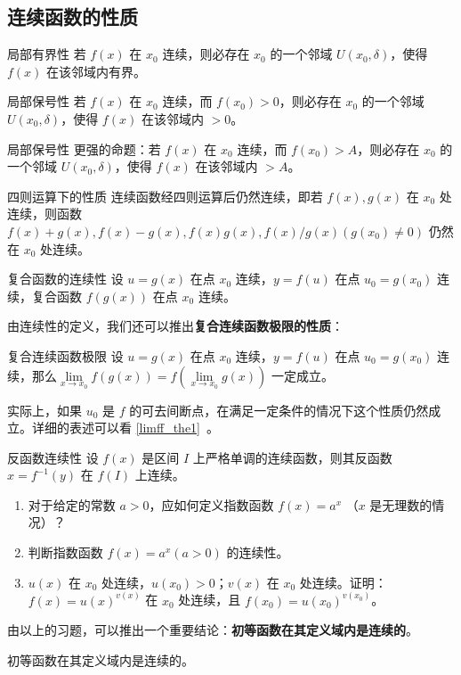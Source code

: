 \subsection{连续函数的性质}
\begin{theorem}{局部有界性}
若 $f(x)$ 在 $x_0$ 连续，则必存在 $x_0$ 的一个邻域 $U(x_0,\delta)$，使得 $f(x)$ 在该邻域内有界。
\end{theorem}
\begin{theorem}{局部保号性}
若 $f(x)$ 在 $x_0$ 连续，而 $f(x_0)>0$，则必存在 $x_0$ 的一个邻域 $U(x_0,\delta)$，使得 $f(x)$ 在该邻域内 $>0$。
\end{theorem}
\begin{theorem}{局部保号性}
更强的命题：若 $f(x)$ 在 $x_0$ 连续，而 $f(x_0)>A$，则必存在 $x_0$ 的一个邻域 $U(x_0,\delta)$，使得 $f(x)$ 在该邻域内 $>A$。
\end{theorem}
\begin{theorem}{四则运算下的性质}
连续函数经四则运算后仍然连续，即若 $f(x),g(x)$ 在 $x_0$ 处连续，则函数 $f(x)+g(x),f(x)-g(x),f(x)g(x),f(x)/g(x)(g(x_0)\neq 0)$ 仍然在 $x_0$ 处连续。
\end{theorem}

\begin{theorem}{复合函数的连续性}
设 $u=g(x)$ 在点 $x_0$ 连续，$y=f(u)$ 在点 $u_0=g(x_0)$ 连续，复合函数 $f(g(x))$ 在点 $x_0$ 连续。
\end{theorem}

由连续性的定义，我们还可以推出\textbf{复合连续函数极限的性质}：
\begin{theorem}{复合连续函数极限}
设 $u=g(x)$ 在点 $x_0$ 连续，$y=f(u)$ 在点 $u_0=g(x_0)$ 连续，那么$\lim\limits_{x\rightarrow x_0}f(g(x))=f(\lim\limits_{x\rightarrow x_0}g(x))$ 一定成立。
\end{theorem}


实际上，如果 $u_0$ 是 $f$ 的可去间断点，在满足一定条件的情况下这个性质仍然成立。详细的表述可以看 \autoref{limff_the1}~。

\begin{theorem}{反函数连续性}
设 $f(x)$ 是区间 $I$ 上严格单调的连续函数，则其反函数 $x=f^{-1}(y)$ 在 $f(I)$ 上连续。
\end{theorem}

\begin{exercise}{}
\begin{enumerate}
\item 对于给定的常数 $a>0$，应如何定义指数函数 $f(x)=a^x$ （$x$ 是无理数的情况）？
\item 判断指数函数 $f(x)=a^x(a>0)$ 的连续性。
\item $u(x)$ 在 $x_0$ 处连续，$u(x_0)>0$；$v(x)$ 在 $x_0$ 处连续。证明： $f(x)=u(x)^{v(x)}$ 在 $x_0$ 处连续，且 $f(x_0)=u(x_0)^{v(x_0)}$。
\end{enumerate}

由以上的习题，可以推出一个重要结论：\textbf{初等函数在其定义域内是连续的}。
\end{exercise}
\begin{theorem}{}
初等函数在其定义域内是连续的。
\end{theorem}